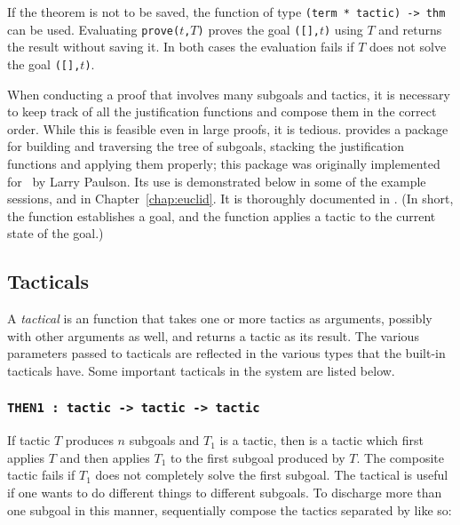If the theorem is not to be saved, the function  of type
{\small\verb|(term * tactic) -> thm|} can be used.  Evaluating
{\small\verb|prove(|}$t${\small\verb|,|}$T${\small\verb|)|} proves   the   goal
{\small\verb|([],|}$t${\small\verb|)|} using $T$ and returns the result without
saving it.  In both cases  the evaluation  fails if  $T$ does  not solve the
goal {\small\verb|([],|}$t${\small\verb|)|}.

When conducting a proof that involves many subgoals and tactics, it is necessary to keep track of all the justification functions and compose them in the correct order.
While this is feasible even in large proofs, it is tedious.
\HOL{} provides a package for building and traversing the tree of subgoals, stacking the justification functions and applying them properly; this package was originally implemented for \LCF\ by Larry Paulson.
Its use is demonstrated below in some of the example sessions, and in Chapter~\ref{chap:euclid}.
It is thoroughly documented in \DESCRIPTION.
(In short, the \ML{} function  establishes a goal, and the \ML{} function  applies a tactic to the current state of the goal.)

\subsection{Tacticals}
\label{tacticals}

A {\it tactical\/} is an \ML{} function that takes one or more tactics
as arguments, possibly with other arguments as well, and returns a
tactic as its result.  The various parameters passed to tacticals are
reflected in the various \ML{} types that the built-in tacticals have.
Some important tacticals in the \HOL{} system are listed below.

\subsubsection{\tt THEN1 : tactic -> tactic -> tactic}

If tactic $T$ produces $n$ subgoals and $T_1$ is a tactic, then  is a tactic which first applies $T$ and then applies $T_1$ to the first subgoal produced by $T$. The composite tactic fails if $T_1$ does not completely solve the first subgoal.
The tactical  is useful if one wants to do different things to different subgoals.
To discharge more than one subgoal in this manner, sequentially compose the tactics separated by  like so: 

